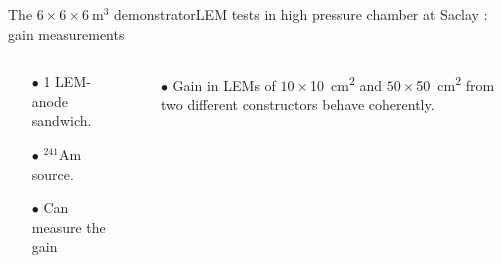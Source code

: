 \documentclass[10pt]{beamer}
\begin{document}
\begin{frame}{The \texorpdfstring{$6 \times 6 \times \SI{6}{\meter\cubed}$}{666} demonstrator}{LEM tests in high pressure chamber at Saclay : gain measurements}
\begin{scriptsize}
\begin{columns}
    			\begin{column}{0.38\textwidth}
    				\begin{itemize}
    					\item[$\bullet$] 1 LEM-anode sandwich.
    					\item[$\bullet$] $^{241}$Am source.
    					\item[$\bullet$] Can measure the gain
    				\end{itemize}
    			\end{column}\hfill
    			\begin{column}{0.58\textwidth}
    				\begin{itemize}
    					\item[$\bullet$] Gain in LEMs of $10\times$\SI{10}{\centi\meter\squared} and $50\times$\SI{50}{\centi\meter\squared} from two different constructors behave coherently.
    				\end{itemize}
    			\end{column}
    		\end{columns}
    	\end{scriptsize}
    \end{frame}
    
\end{document}
